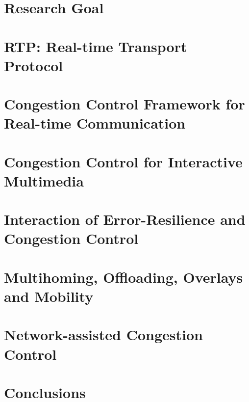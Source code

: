 \documentclass[dissertation,draft*]{aaltoseries} %
\begin{document}
\chapter{Research Goal}
\label{chap:rg}


\chapter{RTP: Real-time Transport Protocol}
\label{chap:rtp}


\chapter{Congestion Control Framework for Real-time Communication}
\label{chap:cc.fw}


\chapter{Congestion Control for Interactive Multimedia}
\label{chap:cc}


 \chapter{Interaction of Error-Resilience and Congestion Control}
 \label{chap:er-cc}

\chapter{Multihoming, Offloading, Overlays and Mobility}
\label{chap:mprtp}

 \chapter{Network-assisted Congestion Control}
 \label{chap:cc.nw}
 

\chapter{Conclusions}
\label{chap:conc}


\end{document}
